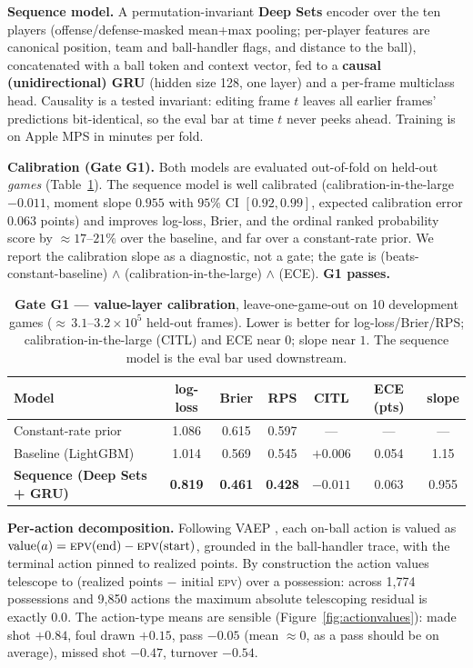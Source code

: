 \documentclass[11pt]{article}
\newcommand{\epv}{\textsc{epv}}
\begin{document}
\textbf{Sequence model.} A permutation-invariant \textbf{Deep Sets} \citep{zaheer2017deepsets} encoder over
the ten players (offense/defense-masked mean+max pooling; per-player features are canonical position,
team and ball-handler flags, and distance to the ball), concatenated with a ball token and context vector,
fed to a \textbf{causal (unidirectional) GRU} \citep{cho2014gru} (hidden size 128, one layer) and a
per-frame multiclass head. Causality is a tested invariant: editing frame $t$ leaves all earlier frames'
predictions bit-identical, so the eval bar at time $t$ never peeks ahead. Training is on Apple MPS in
minutes per fold.

\textbf{Calibration (Gate G1).} Both models are evaluated out-of-fold on held-out \emph{games}
(Table~\ref{tab:g1}). The sequence model is well calibrated (calibration-in-the-large $-0.011$, moment
slope $0.955$ with $95\%$ CI $[0.92,0.99]$, expected calibration error $0.063$ points) and improves
log-loss, Brier, and the ordinal ranked probability score by $\approx\!17$--$21\%$ over the baseline, and
far over a constant-rate prior. We report the calibration slope as a diagnostic, not a gate; the gate is
(beats-constant-baseline) $\wedge$ (calibration-in-the-large) $\wedge$ (ECE). \textbf{G1 passes.}

\begin{table}[t]
\centering
\caption{\textbf{Gate G1 --- value-layer calibration}, leave-one-game-out on 10 development games
($\approx$\,$3.1$--$3.2\times10^5$ held-out frames). Lower is better for log-loss/Brier/RPS;
calibration-in-the-large (CITL) and ECE near $0$; slope near $1$. The sequence model is the eval bar used
downstream.}
\label{tab:g1}
\small
\begin{tabular}{lcccccc}
\toprule
Model & log-loss & Brier & RPS & CITL & ECE (pts) & slope \\
\midrule
Constant-rate prior      & 1.086 & 0.615 & 0.597 & ---     & ---   & ---   \\
Baseline (LightGBM)      & 1.014 & 0.569 & 0.545 & $+0.006$ & 0.054 & 1.15  \\
\textbf{Sequence (Deep Sets + GRU)} & \textbf{0.819} & \textbf{0.461} & \textbf{0.428} & $-0.011$ & 0.063 & 0.955 \\
\bottomrule
\end{tabular}
\end{table}

\textbf{Per-action decomposition.} Following VAEP \citep{decroos2019actions}, each on-ball action is
valued as $\text{value}(a) = \epv{}(\text{end}) - \epv{}(\text{start})$, grounded in the ball-handler
trace, with the terminal action pinned to realized points. By construction the action values telescope to
(realized points $-$ initial \epv{}) over a possession: across 1{,}774 possessions and 9{,}850 actions the
maximum absolute telescoping residual is exactly $0.0$. The action-type means are sensible
(Figure~\ref{fig:actionvalues}): made shot $+0.84$, foul drawn $+0.15$, pass $-0.05$ (mean $\approx 0$,
as a pass should be on average), missed shot $-0.47$, turnover $-0.54$.
\end{document}
